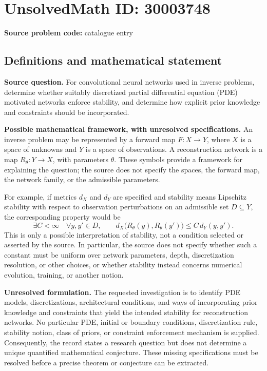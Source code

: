 \documentclass[11pt]{article}
\begin{document}
\section*{UnsolvedMath ID: 30003748}
\textbf{Source problem code:} catalogue entry
\subsection{Definitions and mathematical statement}
\textbf{Source question.} For convolutional neural networks used in inverse problems, determine whether suitably discretized partial differential equation (PDE) motivated networks enforce stability, and determine how explicit prior knowledge and constraints should be incorporated.

\textbf{Possible mathematical framework, with unresolved specifications.} An inverse problem may be represented by a forward map \(F:X\to Y\), where \(X\) is a space of unknowns and \(Y\) is a space of observations. A reconstruction network is a map \(R_\theta:Y\to X\), with parameters \(\theta\). These symbols provide a framework for explaining the question; the source does not specify the spaces, the forward map, the network family, or the admissible parameters.

For example, if metrics \(d_X\) and \(d_Y\) are specified and stability means Lipschitz stability with respect to observation perturbations on an admissible set \(D\subseteq Y\), the corresponding property would be
\[
\exists C<\infty\quad\forall y,y'\in D,\qquad
 d_X\bigl(R_\theta(y),R_\theta(y')\bigr)\le C\,d_Y(y,y').
\]
This is only a possible interpretation of stability, not a condition selected or asserted by the source. In particular, the source does not specify whether such a constant must be uniform over network parameters, depth, discretization resolution, or other choices, or whether stability instead concerns numerical evolution, training, or another notion.

\textbf{Unresolved formulation.} The requested investigation is to identify PDE models, discretizations, architectural conditions, and ways of incorporating prior knowledge and constraints that yield the intended stability for reconstruction networks. No particular PDE, initial or boundary conditions, discretization rule, stability notion, class of priors, or constraint enforcement mechanism is supplied. Consequently, the record states a research question but does not determine a unique quantified mathematical conjecture. These missing specifications must be resolved before a precise theorem or conjecture can be extracted.
\end{document}
